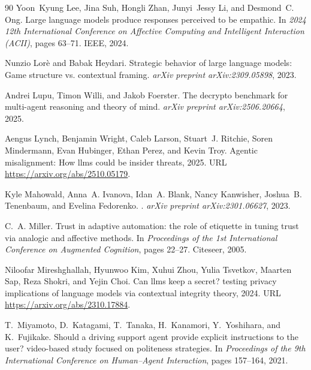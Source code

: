 \begin{thebibliography}{90}
Yoon~Kyung Lee, Jina Suh, Hongli Zhan, Junyi~Jessy Li, and Desmond~C. Ong.
\newblock Large language models produce responses perceived to be empathic.
\newblock In \emph{2024 12th International Conference on Affective Computing and Intelligent Interaction (ACII)}, pages 63--71. IEEE, 2024.

Nunzio Lor{\`e} and Babak Heydari.
\newblock Strategic behavior of large language models: Game structure vs. contextual framing.
\newblock \emph{arXiv preprint arXiv:2309.05898}, 2023.

Andrei Lupu, Timon Willi, and Jakob Foerster.
\newblock The decrypto benchmark for multi-agent reasoning and theory of mind.
\newblock \emph{arXiv preprint arXiv:2506.20664}, 2025.

Aengus Lynch, Benjamin Wright, Caleb Larson, Stuart~J. Ritchie, Soren Mindermann, Evan Hubinger, Ethan Perez, and Kevin Troy.
\newblock Agentic misalignment: How llms could be insider threats, 2025.
\newblock URL \url{https://arxiv.org/abs/2510.05179}.

Kyle Mahowald, Anna~A. Ivanova, Idan~A. Blank, Nancy Kanwisher, Joshua~B. Tenenbaum, and Evelina Fedorenko.
.
\newblock \emph{arXiv preprint arXiv:2301.06627}, 2023.

C.~A. Miller.
\newblock Trust in adaptive automation: the role of etiquette in tuning trust via analogic and affective methods.
\newblock In \emph{Proceedings of the 1st International Conference on Augmented Cognition}, pages 22--27. Citeseer, 2005.

Niloofar Mireshghallah, Hyunwoo Kim, Xuhui Zhou, Yulia Tsvetkov, Maarten Sap, Reza Shokri, and Yejin Choi.
\newblock Can llms keep a secret? testing privacy implications of language models via contextual integrity theory, 2024.
\newblock URL \url{https://arxiv.org/abs/2310.17884}.

T.~Miyamoto, D.~Katagami, T.~Tanaka, H.~Kanamori, Y.~Yoshihara, and K.~Fujikake.
\newblock Should a driving support agent provide explicit instructions to the user? video-based study focused on politeness strategies.
\newblock In \emph{Proceedings of the 9th International Conference on Human--Agent Interaction}, pages 157--164, 2021.


\end{thebibliography}
